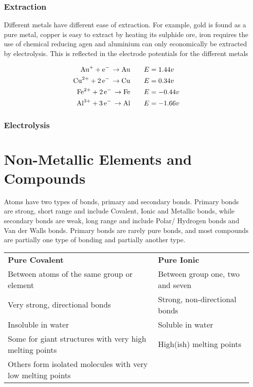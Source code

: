 \documentclass[a4paper, 12pt]{article}
\begin{document}
		\subsubsection*{Extraction}
			Different metals have different ease of extraction. For example, gold is found as a pure metal, copper is easy to extract by heating its sulphide ore, iron requires the use of chemical reducing agen and aluminium can only economically be extracted by electrolysis. This is reflected in the electrode potentials for the different metals
			
			\begin{align*}
				\ce{Au+ + e- \rightarrow Au} \qquad &E = 1.44v \\
				\ce{Cu^2+ + 2e- \rightarrow Cu} \qquad &E = 0.34v \\
				\ce{Fe^2+ + 2e- \rightarrow Fe} \qquad &E =-0.44v \\
				\ce{Al^3+ + 3e- \rightarrow Al} \qquad &E =-1.66v \\
			\end{align*}
			
		\subsubsection*{Electrolysis}
		
\newpage
		
\section{Non-Metallic Elements and Compounds}
	Atoms have two types of bonds, primary and secondary bonds. Primary bonds are strong, short range and include Covalent, Ionic and Metallic bonds, while secondary bonds are weak, long range and include Polar/ Hydrogen bonds and Van der Walls bonds. Primary bonds are rarely pure bonds, and most compounds are partially one type of bonding and partially another type. \\
	\newline
	\begin{tabularx}{\textwidth}{X X}
		\textbf{Pure Covalent} & \textbf{Pure Ionic} \\
		Between atoms of the same group or element & Between group one, two and seven \\
		Very strong, directional bonds & Strong, non-directional bonds \\
		Insoluble in water & Soluble in water \\
		Some for giant structures with very high melting points & High(ish) melting points \\
		Others form isolated molecules with very low melting points & \\
	\end{tabularx}
	
\end{document}
